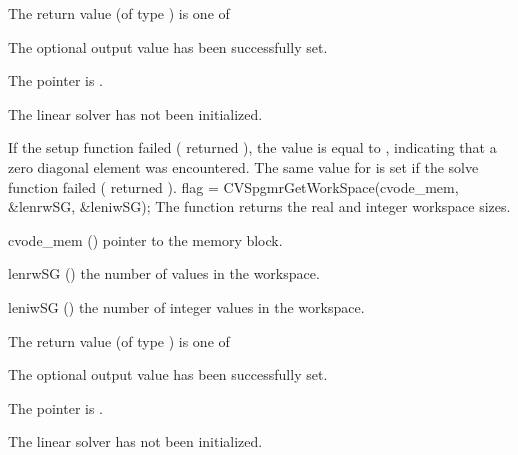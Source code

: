 {
  The return value  (of type ) is one of
  \begin{args}
  \item[\Id{CVDIAG\_SUCCESS}] 
    The optional output value has been successfully set.
  \item[\Id{CVDIAG\_MEM\_NULL}]
    The  pointer is .
  \item[\Id{CVDIAG\_LMEM\_NULL}]
    The {\cvdiag} linear solver has not been initialized.
  \end{args}
}
{
  If the {\cvdiag} setup function failed ( returned ),
  the value  is equal to , indicating that a zero
  diagonal element was encountered.
  The same value for  is set if the {\cvdiag} solve function failed
  ( returned ).
}
%
%
{
  flag = CVSpgmrGetWorkSpace(cvode\_mem, \&lenrwSG, \&leniwSG);
}
{
  The function  returns the
  {\cvspgmr} real and integer workspace sizes.
}
{
  \begin{args}
  \item[cvode\_mem] ()
    pointer to the {\cvode} memory block.
  \item[lenrwSG] ()
    the number of  values in the {\cvspgmr} workspace.
  \item[leniwSG] ()
    the number of integer values in the {\cvspgmr} workspace.
  \end{args}
}
{
  The return value  (of type ) is one of
  \begin{args}
  \item[\Id{CVSPGMR\_SUCCESS}] 
    The optional output value has been successfully set.
  \item[\Id{CVSPGMR\_MEM\_NULL}]
    The  pointer is .
  \item[\Id{CVSPGMR\_LMEM\_NULL}]
    The {\cvspgmr} linear solver has not been initialized.
  \end{args}
}
